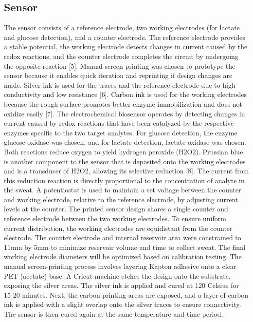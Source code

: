 \documentclass[conference]{IEEEtran}
\begin{document}
\subsection{Sensor}
The sensor consists of a reference electrode, two working electrodes (for lactate and glucose detection), and a counter electrode. The reference electrode provides a stable potential, the working electrode detects changes in current caused by the redox reactions, and the counter electrode completes the circuit by undergoing the opposite reaction [5].
Manual screen printing was chosen to prototype the sensor because it enables quick iteration and reprinting if design changes are made. Silver ink is used for the traces and the reference electrode due to high conductivity and low resistance [6]. Carbon ink is used for the working electrodes because the rough surface promotes better enzyme immobilization and does not oxidize easily [7]. 
The electrochemical biosensor operates by detecting changes in current caused by redox reactions that have been catalyzed by the respective enzymes specific to the two target analytes. For glucose detection, the enzyme glucose oxidase was chosen, and for lactate detection, lactate oxidase was chosen. Both reactions reduce oxygen to yield hydrogen peroxide (H2O2). Prussian blue is another component to the sensor that is deposited onto the working electrodes and is a transducer of H2O2, allowing its selective reduction [8]. The current from this reduction reaction is directly proportional to the concentration of analyte in the sweat. A potentiostat is used to maintain a set voltage between the counter and working electrode, relative to the reference electrode, by adjusting current levels at the counter.
The printed sensor design shares a single counter and reference electrode between the two working electrodes. To ensure uniform current distribution, the working electrodes are equidistant from the counter electrode. The counter electrode and internal reservoir area were constrained to 11mm by 5mm to minimize reservoir volume and time to collect sweat. The final working electrode diameters will be optimized based on calibration testing.
The manual screen-printing process involves layering Kapton adhesive onto a clear PET (acetate) base. A Cricut machine etches the design onto the substrate, exposing the silver areas. The silver ink is applied and cured at 120 Celsius for 15-20 minutes. Next, the carbon printing areas are exposed, and a layer of carbon ink is applied with a slight overlap onto the silver traces to ensure connectivity. The sensor is then cured again at the same temperature and time period.
\end{document}
